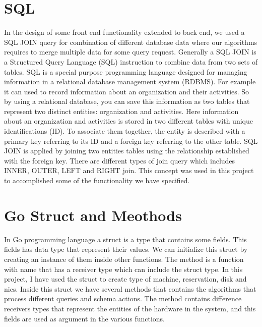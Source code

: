 \section{SQL}
In the design of some front end functionality extended to back end, we used a SQL JOIN query for combination of different database data where our algorithms requires to merge multiple data for some query request. Generally a SQL JOIN is a Structured Query Language (SQL) instruction to combine data from two sets of tables. SQL is a special purpose programming language designed for managing information in a relational database management system (RDBMS). For example it can used to record information about an organization and their activities. So by using a relational database, you can save this information as two tables that represent two distinct entities: organization and activities. Here information about an organization and activities is stored in two different tables with unique identifications (ID). To associate them together, the entity is described with a primary key referring to its ID and a foreign key referring to the other table. SQL JOIN is applied by joining two entities tables using the relationship established with the foreign key. There are different types of join query which includes INNER, OUTER, LEFT and RIGHT join. This concept was used in this project to accomplished some of the functionality we have specified.
\section{Go Struct and Meothods}
In Go programming language a struct is a type that contains some fields\cite{Struct}. This fields has data type that represent their values. We can initialize this struct by creating an instance of them inside other functions. \cite{Method}The method is a function with name that has a receiver type which can include the struct type. In this project, I have used the struct to create type of machine, reservation, disk and nics. Inside this struct we have several methods that contains the algorithms that process different  queries and schema actions. The method contains difference receivers types that represent the entities of the hardware in the system, and this fields are used as argument in the various functions. 



